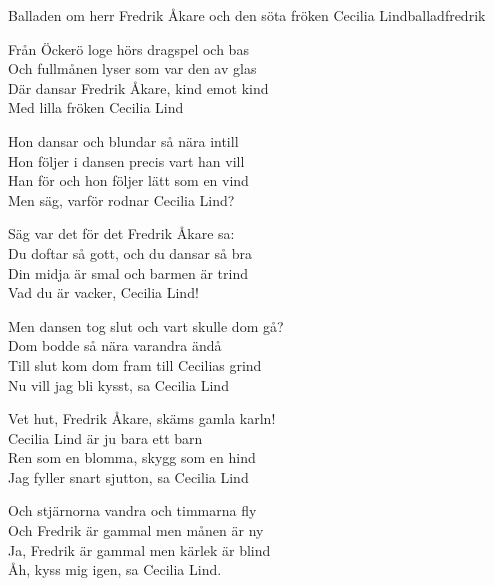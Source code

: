 \begin{song}{Balladen om herr Fredrik Åkare och den söta fröken Cecilia Lind}{balladfredrik}
\begin{vers}
Från Öckerö loge hörs dragspel och bas\\
Och fullmånen lyser som var den av glas\\
Där dansar Fredrik Åkare, kind emot kind\\
Med lilla fröken Cecilia Lind\\
\end{vers}
\begin{vers}
Hon dansar och blundar så nära intill\\
Hon följer i dansen precis vart han vill\\
Han för och hon följer lätt som en vind\\
Men säg, varför rodnar Cecilia Lind?\\
\end{vers}
\begin{vers}
Säg var det för det Fredrik Åkare sa:\\
Du doftar så gott, och du dansar så bra\\
Din midja är smal och barmen är trind\\
Vad du är vacker, Cecilia Lind!\\
\end{vers}
\begin{vers}
Men dansen tog slut och vart skulle dom gå?\\
Dom bodde så nära varandra ändå\\
Till slut kom dom fram till Cecilias grind\\
Nu vill jag bli kysst, sa Cecilia Lind\\
\end{vers}

\newp

\begin{vers}
Vet hut, Fredrik Åkare, skäms gamla karln!\\
Cecilia Lind är ju bara ett barn\\
Ren som en blomma, skygg som en hind\\
Jag fyller snart sjutton, sa Cecilia Lind\\
\end{vers}

\begin{vers}
Och stjärnorna vandra och timmarna fly\\
Och Fredrik är gammal men månen är ny\\
Ja, Fredrik är gammal men kärlek är blind\\
Åh, kyss mig igen, sa Cecilia Lind. \\
\end{vers}
\end{song}
